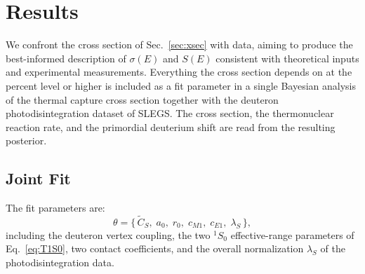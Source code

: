 \documentclass[
  aps,prd,twocolumn,nofootinbib,superscriptaddress,
  longbibliography,floatfix,preprintnumbers
]{revtex4-2}
\newcommand{\Mone}{M1}
\newcommand{\Eone}{E1}
\newcommand{\CSv}{\tilde{C}_{S}}
\begin{document}
\section{Results}
\label{sec:results}

We confront the cross section of Sec.~\ref{sec:xsec} with data, aiming to produce the best-informed
description of $\sigma(E)$ and $S(E)$ consistent with theoretical inputs and experimental measurements.
Everything the cross section depends on at the percent level or higher is included as a fit parameter in a single Bayesian analysis of the thermal
capture cross section together with the deuteron photodisintegration dataset of
SLEGS. The cross section, the thermonuclear reaction rate, and the primordial
deuterium shift are read from the resulting posterior.

\subsection{Joint Fit}
\label{sec:jointfit}

The fit parameters are:
\begin{equation}
  \theta=\big\{\,\CSv,\;a_{0},\;r_{0},\;c_{\Mone},\;c_{\Eone},\;\lambda_{S}\,\big\},
  \label{eq:theta}
\end{equation}
including the deuteron vertex coupling, the two ${}^{1}S_{0}$ effective-range parameters
of Eq.~\eqref{eq:T1S0}, two contact coefficients, and the overall normalization
$\lambda_{S}$ of the photodisintegration data.
\end{document}
